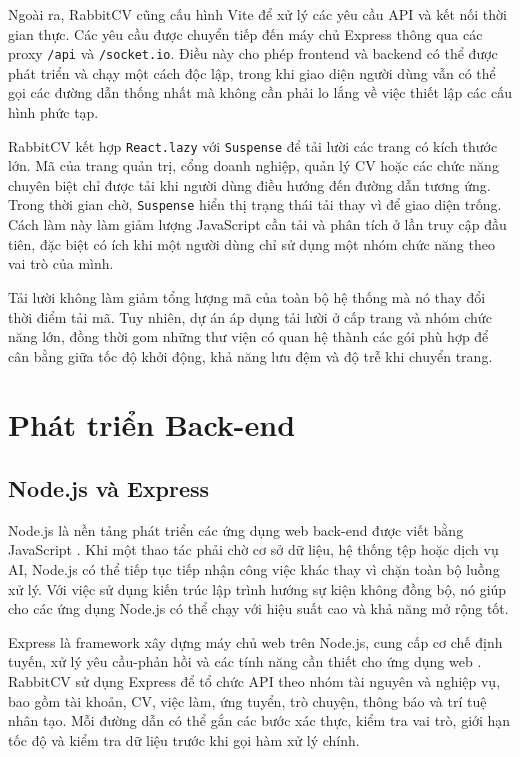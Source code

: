 Ngoài ra, RabbitCV cũng cấu hình Vite để xử lý các yêu cầu API và kết nối thời gian thực. Các yêu cầu được chuyển tiếp đến máy chủ Express thông qua các proxy \texttt{/api} và \texttt{/socket.io}. Điều này cho phép frontend và backend có thể được phát triển và chạy một cách độc lập, trong khi giao diện người dùng vẫn có thể gọi các đường dẫn thống nhất mà không cần phải lo lắng về việc thiết lập các cấu hình phức tạp.

RabbitCV kết hợp \texttt{React.lazy} với \texttt{Suspense} để tải lười các trang có kích thước lớn. Mã của trang quản trị, cổng doanh nghiệp, quản lý CV hoặc các chức năng chuyên biệt chỉ được tải khi người dùng điều hướng đến đường dẫn tương ứng. Trong thời gian chờ, \texttt{Suspense} hiển thị trạng thái tải thay vì để giao diện trống. Cách làm này làm giảm lượng JavaScript cần tải và phân tích ở lần truy cập đầu tiên, đặc biệt có ích khi một người dùng chỉ sử dụng một nhóm chức năng theo vai trò của mình.

Tải lười không làm giảm tổng lượng mã của toàn bộ hệ thống mà nó thay đổi thời điểm tải mã. Tuy nhiên, dự án áp dụng tải lười ở cấp trang và nhóm chức năng lớn, đồng thời gom những thư viện có quan hệ thành các gói phù hợp để cân bằng giữa tốc độ khởi động, khả năng lưu đệm và độ trễ khi chuyển trang.

\section{Phát triển Back-end}

\subsection{Node.js và Express}

Node.js là nền tảng phát triển các ứng dụng web back-end được viết bằng JavaScript \cite{nodedocs}. Khi một thao tác phải chờ cơ sở dữ liệu, hệ thống tệp hoặc dịch vụ AI, Node.js có thể tiếp tục tiếp nhận công việc khác thay vì chặn toàn bộ luồng xử lý. Với việc sử dụng kiến trúc lập trình hướng sự kiện không đồng bộ, nó giúp cho các ứng dụng Node.js có thể chạy với hiệu suất cao và khả năng mở rộng tốt.

Express là framework xây dựng máy chủ web trên Node.js, cung cấp cơ chế định tuyến, xử lý yêu cầu-phản hồi và các tính năng cần thiết cho ứng dụng web \cite{expressdocs}. RabbitCV sử dụng Express để tổ chức API theo nhóm tài nguyên và nghiệp vụ, bao gồm tài khoản, CV, việc làm, ứng tuyển, trò chuyện, thông báo và trí tuệ nhân tạo. Mỗi đường dẫn có thể gắn các bước xác thực, kiểm tra vai trò, giới hạn tốc độ và kiểm tra dữ liệu trước khi gọi hàm xử lý chính.

